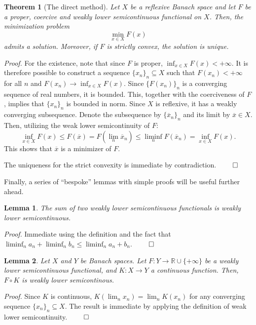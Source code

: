 \documentclass[twocolumn,twoside,a4paper,10pt]{IEEEtran}
\newtheorem{theorem}{Theorem}
\newtheorem{lemma}{Lemma}
\begin{document}
\begin{theorem}[The direct method]\label{thm:direct-method}
  Let \(X\) be a reflexive Banach space and let \(F\) be a proper, coercive and weakly lower semicontinuous functional on \(X\). Then, the minimization problem
  \[
    \min_{x\in X} F(x)
  \]
  admits a solution. Moreover, if \(F\) is strictly convex, the solution is unique.
\end{theorem}
\textit{Proof.} For the existence, note that since \(F\) is proper, \(\inf_{x\in X} F(x)<+\infty\). It is therefore possible to construct a sequence \(\{x_n\}_n\subseteq X\) such that \(F(x_n)<+\infty\) for all \(n\) and \(F(x_n)\to \inf_{x\in X}F(x)\). Since \(\{F(x_n)\}_n\) is a converging sequence of real numbers, it is bounded. This, together with the coerciveness of \(F\), implies that \(\{x_n\}_n\) is bounded in norm. Since \(X\) is reflexive, it has a weakly converging subsequence. Denote the subsequence by \(\{\overline{x}_n\}_n\) and its limit by \(\overline{x}\in X\). Then, utilizing the weak lower semicontinuity of \(F\):
\[
  \inf_{x\in X}F(x) \leq F(\overline{x})=F(\lim_n \overline{x}_n)\leq\liminf_nF(\overline{x}_n)=\inf_{x\in X}F(x)
.\]
This shows that \(\overline{x}\) is a minimizer of \(F\).

The uniqueness for the strict convexity is immediate by contradiction. \(\qed\)

Finally, a series of ``bespoke'' lemmas with simple proofs will be useful further ahead.

\begin{lemma}\label{lemma:sum-of-lsc}
  The sum of two weakly lower semicontinuous functionals is weakly lower semicontinuous.
\end{lemma}

\textit{Proof.} Immediate using the definition and the fact that \(\liminf_n{a_n} + \liminf_n{b_n}\leq \liminf_n{a_n + b_n}\). \(\qed\)

\begin{lemma}\label{lemma:precomposition-with-linear}
  Let \(X\) and \(Y\) be Banach spaces. Let \(F\colon Y\to \mathbb{R}\cup\{+\infty\}\) be a weakly lower semicontinuous functional, and \(K\colon X\to Y\) a continuous function. Then, \(F\circ K\) is weakly lower semicontinous.
\end{lemma}

\textit{Proof.} Since \(K\) is continuous, \(K(\lim_n x_n) = \lim_n K(x_n)\) for any converging sequence \(\{x_n\}_n\subseteq X\). The result is immediate by applying the definition of weak lower semicontinuity. \(\qed\)
\end{document}
